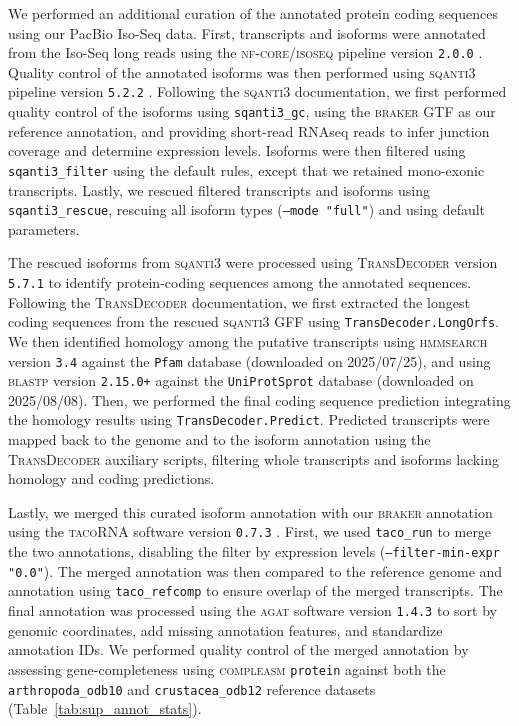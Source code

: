\documentclass[11pt]{article}
\begin{document}
We performed an additional curation of the annotated protein coding sequences using
our PacBio Iso-Seq data.
First, transcripts and isoforms were annotated from the Iso-Seq long reads using
the \textsc{nf-core/isoseq} pipeline version \texttt{2.0.0}
\citep{guizard_nf-coreisoseq_2023}.
Quality control of the annotated isoforms was then performed using \textsc{sqanti3}
pipeline version \texttt{5.2.2} \citep{pardo_sqanti3_2024}.
Following the \textsc{sqanti3} documentation, we first performed quality control
of the isoforms using \texttt{sqanti3\_gc}, using the \textsc{braker} GTF as our
reference annotation, and providing short-read RNAseq reads to infer junction
coverage and determine expression levels.
Isoforms were then filtered using \texttt{sqanti3\_filter} using the default rules,
except that we retained mono-exonic transcripts.
Lastly, we rescued filtered transcripts and isoforms using \texttt{sqanti3\_rescue},
rescuing all isoform types (\texttt{--mode "full"}) and using default parameters.
\vspace{0.2cm}

The rescued isoforms from \textsc{sqanti3} were processed using \textsc{TransDecoder}
version \texttt{5.7.1} \citep{hass_transdecoder} to identify protein-coding sequences
among the annotated sequences.
Following the \textsc{TransDecoder} documentation, we first extracted the longest coding
sequences from the rescued \textsc{sqanti3} GFF using \texttt{TransDecoder.LongOrfs}.
We then identified homology among the putative transcripts using \textsc{hmmsearch}
version \texttt{3.4} \citep{eddy_hmmer_2011} against the \texttt{Pfam} database
(downloaded on 2025/07/25), and using \textsc{blastp} version \texttt{2.15.0+} against
the \texttt{UniProtSprot} database (downloaded on 2025/08/08).
Then, we performed the final coding sequence prediction integrating the homology
results using \texttt{TransDecoder.Predict}.
Predicted transcripts were mapped back to the genome and to the isoform annotation
using the \textsc{TransDecoder} auxiliary scripts, filtering whole transcripts and
isoforms lacking homology and coding predictions.
\vspace{0.2cm}

Lastly, we merged this curated isoform annotation with our \textsc{braker} annotation
using the \textsc{tacoRNA} software version \texttt{0.7.3} \citep{niknafs_taco_2017}.
First, we used \texttt{taco\_run} to merge the two annotations, disabling the filter
by expression levels (\texttt{--filter-min-expr "0.0"}).
The merged annotation was then compared to the reference genome and annotation using
\texttt{taco\_refcomp} to ensure overlap of the merged transcripts.
The final annotation was processed using the \textsc{agat} software version \texttt{1.4.3}
\citep{dainat_another_2022} to sort by genomic coordinates, add missing annotation features,
and standardize annotation IDs.
We performed quality control of the merged annotation by assessing gene-completeness
using \textsc{compleasm} \texttt{protein} against both the \texttt{arthropoda\_odb10}
and \texttt{crustacea\_odb12} reference datasets (Table~\ref{tab:sup_annot_stats}).
\end{document}

